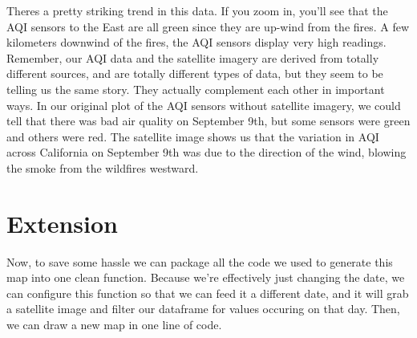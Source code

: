 \documentclass[
  letterpaper,
  DIV=11,
  numbers=noendperiod]{scrreprt}
\begin{document}
Theres a pretty striking trend in this data. If you zoom in, you'll see
that the AQI sensors to the East are all green since they are up-wind
from the fires. A few kilometers downwind of the fires, the AQI sensors
display very high readings. Remember, our AQI data and the satellite
imagery are derived from totally different sources, and are totally
different types of data, but they seem to be telling us the same story.
They actually complement each other in important ways. In our original
plot of the AQI sensors without satellite imagery, we could tell that
there was bad air quality on September 9th, but some sensors were green
and others were red. The satellite image shows us that the variation in
AQI across California on September 9th was due to the direction of the
wind, blowing the smoke from the wildfires westward.

\hypertarget{extension-1}{%
\section{Extension}\label{extension-1}}

Now, to save some hassle we can package all the code we used to generate
this map into one clean function. Because we're effectively just
changing the date, we can configure this function so that we can feed it
a different date, and it will grab a satellite image and filter our
dataframe for values occuring on that day. Then, we can draw a new map
in one line of code.
\end{document}
